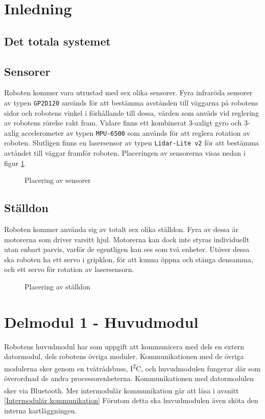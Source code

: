 \documentclass[11pt]{article}
\begin{document}
\begin{flushleft}
\section{Inledning}
\lipsum

\subsection{Det totala systemet}
\lipsum


\subsection{Sensorer}
Roboten kommer vara utrustad med sex olika sensorer. Fyra infraröda sensorer av typen \verb+GP2D120+ används för att bestämma avstånden till väggarna på robotens sidor och robotens vinkel i förhållande till dessa, värden som anväds vid reglering av robotens rörelse rakt fram. Vidare finns ett kombinerat 3-axligt gyro och 3-axlig accelerometer av typen \verb+MPU-6500+ som används för att reglera rotation av roboten. Slutligen finns en lasersensor av typen \verb+Lidar-Lite v2+ för att bestämma avtåndet till väggar framför roboten. Placeringen av sensorerna visas nedan i figur \ref{sensor}.

\begin{figure}[htbp]
\centering
\noindent\resizebox{.8\linewidth}{!}{
	}
	\caption{Placering av sensorer \label{sensor}}	
\end{figure}

\subsection{Ställdon}
Roboten kommer använda sig av totalt sex olika ställdon. Fyra av dessa är motorerna som driver varsitt hjul. Motorerna kan dock inte styras individuellt utan enbart parvis, varför de egentligen kan ses som två enheter. Utöver dessa ska roboten ha ett servo i gripklon, för att kunna öppna och stänga densamma, och ett servo för rotation av lasersensorn.
\begin{figure}[htbp]
\centering
\noindent\resizebox{.8\linewidth}{!}{
	}
	\caption{Placering av ställdon \label{ställdon}}	
\end{figure}

\pagebreak
\section{Delmodul 1 - Huvudmodul}
Robotens huvudmodul har som uppgift att kommunicera med dels en extern datormodul, dels robotens övriga moduler. Kommunikationen med de övriga modulerna sker genom en tvåtrådsbuss, I\textsuperscript{2}C, och huvudmodulen fungerar där som överordnad de andra processorenheterna. Kommunikationen med datormodulen sker via  Bluetooth\textsuperscript{\circledR}. Mer intermodulär kommunikation går att läsa i avsnitt \ref{Intermodulär kommunikation} Förutom detta ska huvudmodulen även sköta den interna kartläggningen. 


\end{flushleft}
\end{document}

